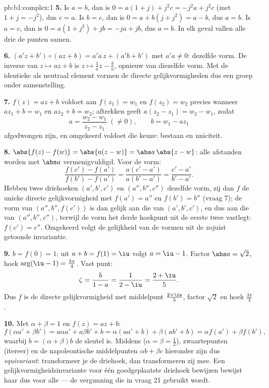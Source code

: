 \begin{solution}{pb:b1:complex:1}
\textbf{5.} Is $a = b$, dan is $0 = a(1 + j) + j^2 c = -j^2 a + j^2 c$
(met $1 + j = -j^2$), dus $c = a$. Is $b = c$, dan is $0 = a + b(j + j^2)
= a - b$, dus $a = b$. Is $a = c$, dan is $0 = a(1 + j^2) + jb = -ja +
jb$, dus $a = b$. In elk geval vallen alle drie de punten samen.

\textbf{6.} $(a'z + b') \circ (az + b) = a'a\,z + (a'b + b')$ met $a'a
\neq 0$: dezelfde vorm. De inverse van $z \mapsto az + b$ is $z \mapsto
\frac1a z - \frac ba$, opnieuw van diezelfde vorm. Met de identieke
 als neutraal element vormen de directe gelijkvormigheden dus
een groep onder samenstelling.

\textbf{7.} $f(z) = az + b$ voldoet aan $f(z_1) = w_1$ en $f(z_2) = w_2$
precies wanneer $a z_1 + b = w_1$ en $a z_2 + b = w_2$; aftrekken geeft
$a(z_2 - z_1) = w_2 - w_1$, zodat
\[
a = \frac{w_2 - w_1}{z_2 - z_1} \;(\neq 0), \qquad
b = w_1 - a z_1
\]
afgedwongen zijn, en omgekeerd voldoet die keuze: bestaan en uniciteit.

\textbf{8.} $\abs{f(z) - f(w)} = \abs{a(z - w)} = \abs a\,\abs{z - w}$:
alle afstanden worden met $\abs a$ vermenigvuldigd. Voor de vorm:
\[
\frac{f(c') - f(a')}{f(b') - f(a')} = \frac{a(c' -
a')}{a(b' - a')} = \frac{c' - a'}{b' - a'} .
\]
Hebben twee driehoeken $(a', b', c')$ en $(a'', b'', c'')$ dezelfde vorm,
zij dan $f$ de unieke directe gelijkvormigheid met $f(a') = a''$ en
$f(b') = b''$ (vraag 7); de vorm van $(a'', b'', f(c'))$ is dan gelijk
aan die van $(a', b', c')$, en dus aan die van $(a'', b'', c'')$, terwijl
de vorm het derde hoekpunt uit de eerste twee vastlegt: $f(c') = c''$.
Omgekeerd volgt de gelijkheid van de vormen uit de zojuist getoonde
invariantie.

\textbf{9.} $b = f(0) = 1$; uit $a + b = f(1) = \iu$ volgt $a = \iu - 1$.
Factor $\abs a = \sqrt2$, hoek $\arg(\iu - 1) = \frac{3\pi}4$. Vast punt:
\[
\zeta = \frac{b}{1 - a} = \frac1{2 - \iu} = \frac{2 + \iu}5 .
\]
Dus $f$ is de directe gelijkvormigheid met middelpunt $\frac{2+\iu}5$,
factor $\sqrt2$ en hoek $\frac{3\pi}4$.

\textbf{10.} Met $\alpha + \beta = 1$ en $f(z) = az + b$:
\[
f(\alpha a' + \beta b') = a\alpha a' + a\beta b' + b
= \alpha(a a' + b) + \beta(a b' + b)
= \alpha f(a') + \beta f(b') ,
\]
waarbij $b = (\alpha + \beta)b$ de sleutel is. Middens ($\alpha = \beta =
\frac12$), zwaartepunten (itereer) en de napoleontische middelpunten
$\alpha b + \beta c$ hieronder zijn dus \emph{equivariant}: transformeer
je de driehoek, dan transformeren zij mee. Een gelijkvormigheidsinvariante
 voor één goedgeplaatste driehoek bewijzen bewijst haar dus voor
alle --- de vergunning die in vraag 21 gebruikt wordt.


\end{solution}
